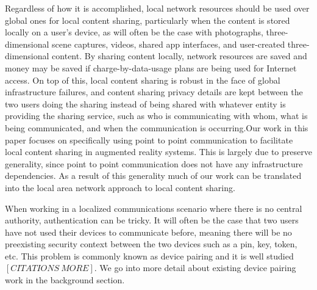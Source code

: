 \documentclass[12pt]{report}
\begin{document}
Regardless of how it is accomplished, local network resources should be used over global ones for local content sharing, particularly when the content is stored locally on a user's device, as will often be the case with photographs, three-dimensional scene captures, videos, shared app interfaces, and user-created three-dimensional content. By sharing content locally, network resources are saved and money may be saved if charge-by-data-usage plans are being used for Internet access. On top of this, local content sharing is robust in the face of global infrastructure failures, and content sharing privacy details are kept between the two users doing the sharing instead of being shared with whatever entity is providing the sharing service, such as who is communicating with whom, what is being communicated, and when the communication is occurring.Our work in this paper focuses on specifically using point to point communication to facilitate local content sharing in augmented reality systems. This is largely due to preserve generality, since point to point communication does not have any infrastructure dependencies. As a result of this generality much of our work can be translated into the local area network approach to local content sharing. \par

When working in a localized communications scenario where there is no central authority, authentication can be tricky. It will often be the case that two users have not used their devices to communicate before, meaning there will be no preexisting security context between the two devices such as a pin, key, token, etc. This problem is commonly known as device pairing and it is well studied \cite{ConferenceCompStudySecurePairingKumar2009,VisualChannelPairingSaxena2006,InBandPairingGollaktoa2011,DucklingStajano2000,PlayfulPairingGallego2011,SASVaudenay2005} $[CITATIONS \: MORE]$. We go into more detail about existing device pairing work in the background section. \par 
\end{document}
